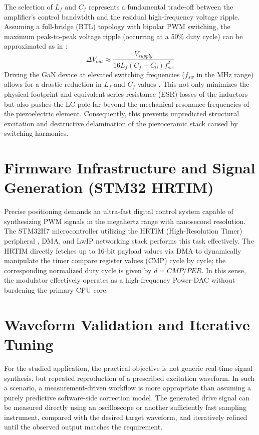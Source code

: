 \documentclass[10pt, conference, letterpaper]{IEEEtran}
\begin{document}
The selection of $L_f$ and $C_f$ represents a fundamental trade-off between the amplifier's control bandwidth and the residual high-frequency voltage ripple. Assuming a full-bridge (BTL) topology with bipolar PWM switching, the maximum peak-to-peak voltage ripple (occurring at a 50\% duty cycle) can be approximated as in \cite{LC_filter_design}:
\begin{equation}
\Delta V_{out} \approx \frac{V_{supply}}{16 L_f (C_f + C_0) f_{sw}^2}
\label{eq:ripple_estimate}
\end{equation}
Driving the GaN device at elevated switching frequencies ($f_{sw}$ in the MHz range) allows for a drastic reduction in $L_f$ and $C_f$ values \cite{LC_filter_design}. This not only minimizes the physical footprint and equivalent series resistance (ESR) losses of the inductors but also pushes the LC pole far beyond the mechanical resonance frequencies of the piezoelectric element. Consequently, this prevents unpredicted structural excitation and destructive delamination of the piezoceramic stack caused by switching harmonics.

\section{Firmware Infrastructure and Signal Generation (STM32 HRTIM)}
Precise positioning demands an ultra-fast digital control system capable of synthesizing PWM signals in the megahertz range with nanosecond resolution. The STM32H7 microcontroller utilizing the HRTIM (High-Resolution Timer) peripheral \cite{stm32_hrtim}, DMA, and LwIP networking stack performs this task effectively. The HRTIM directly fetches up to 16-bit payload values via DMA to dynamically manipulate the timer compare register values (CMP) cycle by cycle; the corresponding normalized duty cycle is given by $d = CMP/PER$. In this sense, the modulator effectively operates as a high-frequency Power-DAC without burdening the primary CPU core.

\section{Waveform Validation and Iterative Tuning}
For the studied application, the practical objective is not generic real-time signal synthesis, but repeated reproduction of a prescribed excitation waveform. In such a scenario, a measurement-driven workflow is more appropriate than assuming a purely predictive software-side correction model. The generated drive signal can be measured directly using an oscilloscope or another sufficiently fast sampling instrument, compared with the desired target waveform, and iteratively refined until the observed output matches the requirement.
\end{document}

